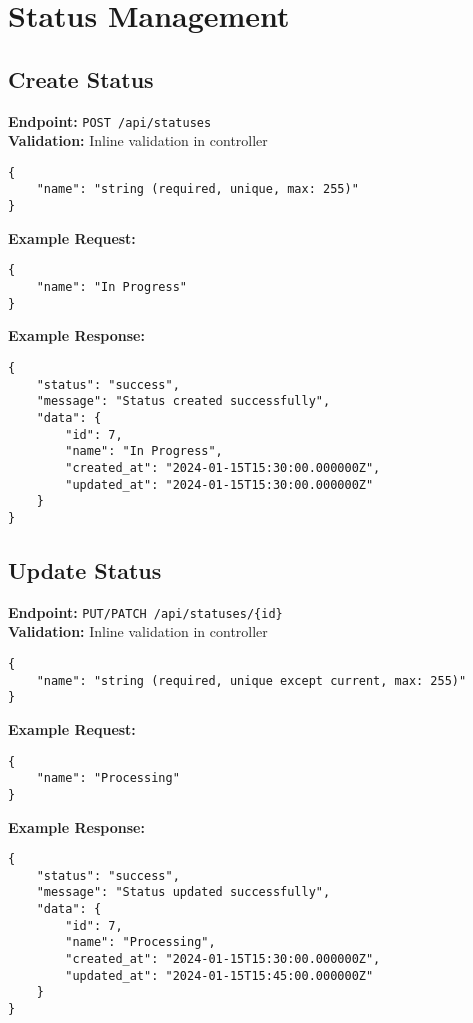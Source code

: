 \documentclass[12pt,a4paper]{article}
\begin{document}
\section{Status Management}

\subsection{Create Status}
\textbf{Endpoint:} \texttt{POST /api/statuses}\\
\textbf{Validation:} Inline validation in controller

\begin{lstlisting}[caption=Create Status Request Body]
{
    "name": "string (required, unique, max: 255)"
}
\end{lstlisting}

\textbf{Example Request:}
\begin{lstlisting}[caption=Create Status Example Request]
{
    "name": "In Progress"
}
\end{lstlisting}

\textbf{Example Response:}
\begin{lstlisting}[caption=Create Status Example Response]
{
    "status": "success",
    "message": "Status created successfully",
    "data": {
        "id": 7,
        "name": "In Progress",
        "created_at": "2024-01-15T15:30:00.000000Z",
        "updated_at": "2024-01-15T15:30:00.000000Z"
    }
}
\end{lstlisting}

\subsection{Update Status}
\textbf{Endpoint:} \texttt{PUT/PATCH /api/statuses/\{id\}}\\
\textbf{Validation:} Inline validation in controller

\begin{lstlisting}[caption=Update Status Request Body]
{
    "name": "string (required, unique except current, max: 255)"
}
\end{lstlisting}

\textbf{Example Request:}
\begin{lstlisting}[caption=Update Status Example Request]
{
    "name": "Processing"
}
\end{lstlisting}

\textbf{Example Response:}
\begin{lstlisting}[caption=Update Status Example Response]
{
    "status": "success",
    "message": "Status updated successfully",
    "data": {
        "id": 7,
        "name": "Processing",
        "created_at": "2024-01-15T15:30:00.000000Z",
        "updated_at": "2024-01-15T15:45:00.000000Z"
    }
}
\end{lstlisting}
\end{document}
